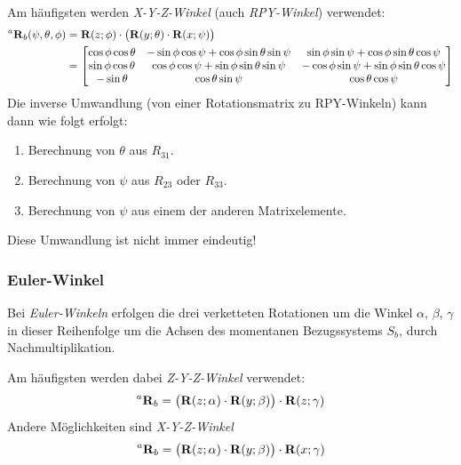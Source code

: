 				Am häufigsten werden \emph{X-Y-Z-Winkel} (auch \emph{RPY-Winkel}) verwendet:
				\begin{align*}
					\prescript{a}{}{\boldsymbol{\mathrm{R}}}_b(\psi, \theta, \phi) &= \boldsymbol{\mathrm{R}}(z; \phi) \cdot \big( \boldsymbol{\mathrm{R}}(y; \theta) \cdot \boldsymbol{\mathrm{R}}(x; \psi) \big) \\
						&=
							\begin{bmatrix}
								\cos\phi \cos\theta & -\sin\phi \cos\psi + \cos\phi \sin\theta \sin\psi & \sin\phi \sin\psi + \cos\phi \sin\theta \cos\psi  \\
								\sin\phi \cos\theta & \cos\phi \cos\psi + \sin\phi \sin\theta \sin\psi  & -\cos\phi \sin\psi + \sin\phi \sin\theta \cos\psi \\
								-\sin\theta         & \cos\theta \sin\psi                               & \cos\theta \cos\psi
							\end{bmatrix}
				\end{align*}
				Die inverse Umwandlung (von einer Rotationsmatrix zu RPY-Winkeln) kann dann wie folgt erfolgt:
				\begin{enumerate}
					\item Berechnung von \(\theta\) aus \( R_{31} \).
					\item Berechnung von \(\psi\) aus \( R_{23} \) oder \( R_{33} \).
					\item Berechnung von \(\psi\) aus einem der anderen Matrixelemente.
				\end{enumerate}
				Diese Umwandlung ist nicht immer eindeutig!

			\subsubsection{Euler-Winkel}
				Bei \emph{Euler-Winkeln} erfolgen die drei verketteten Rotationen um die Winkel \(\alpha\), \(\beta\), \(\gamma\) in dieser Reihenfolge um die Achsen des momentanen Bezugssystems \(S_b\), \dh durch Nachmultiplikation.
				
				Am häufigsten werden dabei \emph{Z-Y-Z-Winkel} verwendet:
				\begin{equation*}
					\prescript{a}{}{\boldsymbol{\mathrm{R}}}_b = \big( \boldsymbol{\mathrm{R}}(z; \alpha) \cdot \boldsymbol{\mathrm{R}}(y; \beta) \big) \cdot \boldsymbol{\mathrm{R}}(z; \gamma)
				\end{equation*}
				Andere Möglichkeiten sind \zB \emph{X-Y-Z-Winkel}
				\begin{equation*}
					\prescript{a}{}{\boldsymbol{\mathrm{R}}}_b = \big( \boldsymbol{\mathrm{R}}(z; \alpha) \cdot \boldsymbol{\mathrm{R}}(y; \beta) \big) \cdot \boldsymbol{\mathrm{R}}(x; \gamma)
				\end{equation*}

